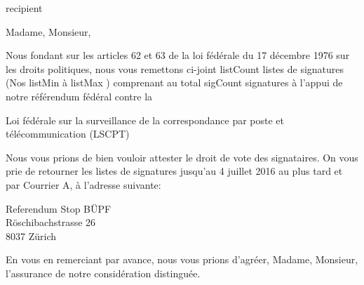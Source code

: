 \documentclass[a4paper,10pt,parskip=half,french]{scrlttr2}
\begin{document}
\begin{letter}{ {{ recipient }} }





\opening{Madame, Monsieur,}

Nous fondant sur les articles 62 et 63 de la loi fédérale du 17 décembre 1976 sur les droits politiques, nous vous remettons ci-joint {{ listCount }} listes de signatures (Nos  {{ listMin }} à {{ listMax }}) comprenant au total {{ sigCount }} signatures à l’appui de notre référendum fédéral contre la

\leftskip=3mm
Loi fédérale sur la surveillance de la correspondance par poste et télécommunication (LSCPT)

\leftskip=0mm
Nous vous prions de bien vouloir attester le droit de vote des signataires. On vous prie de retourner les listes de signatures jusqu'au 4 juillet 2016 au plus tard et par Courrier A, à l’adresse suivante:

\leftskip=3mm
Referendum Stop BÜPF \\
Röschibachstrasse 26 \\
8037 Zürich

\leftskip=0mm
\closing{En vous en remerciant par avance, nous vous prions d’agréer, Madame, Monsieur, l’assurance de notre considération distinguée.}

\end{letter}
\end{document}
